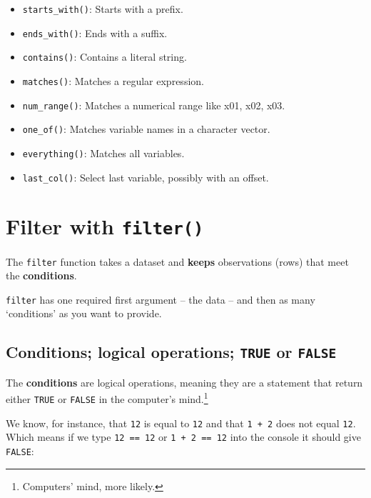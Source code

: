\documentclass[
]{book}
\providecommand{\tightlist}{%
  \setlength{\itemsep}{0pt}\setlength{\parskip}{0pt}}
\begin{document}
\begin{itemize}
\tightlist
\item
  \texttt{starts\_with()}: Starts with a prefix.
\item
  \texttt{ends\_with()}: Ends with a suffix.
\item
  \texttt{contains()}: Contains a literal string.
\item
  \texttt{matches()}: Matches a regular expression.
\item
  \texttt{num\_range()}: Matches a numerical range like x01, x02, x03.
\item
  \texttt{one\_of()}: Matches variable names in a character vector.
\item
  \texttt{everything()}: Matches all variables.
\item
  \texttt{last\_col()}: Select last variable, possibly with an offset.
\end{itemize}

\hypertarget{filter-with-filter}{%
\section{\texorpdfstring{Filter with \texttt{filter()}}{Filter with filter()}}\label{filter-with-filter}}

The \texttt{filter} function takes a dataset and \textbf{keeps} observations (rows) that meet the \textbf{conditions}.

\texttt{filter} has one required first argument -- the data -- and then as many `conditions' as you want to provide.

\hypertarget{conditions-logical-operations-true-or-false}{%
\subsection{\texorpdfstring{Conditions; logical operations; \texttt{TRUE} or \texttt{FALSE}}{Conditions; logical operations; TRUE or FALSE}}\label{conditions-logical-operations-true-or-false}}

The \textbf{conditions} are logical operations, meaning they are a statement that return either \texttt{TRUE} or \texttt{FALSE} in the computer's mind.\footnote{Computers' mind, more likely.}

We know, for instance, that \texttt{12} is equal to \texttt{12} and that \texttt{1\ +\ 2} does not equal \texttt{12}. Which means if we type \texttt{12\ ==\ 12} or \texttt{1\ +\ 2\ ==\ 12} into the console it should give \texttt{FALSE}:
\end{document}
